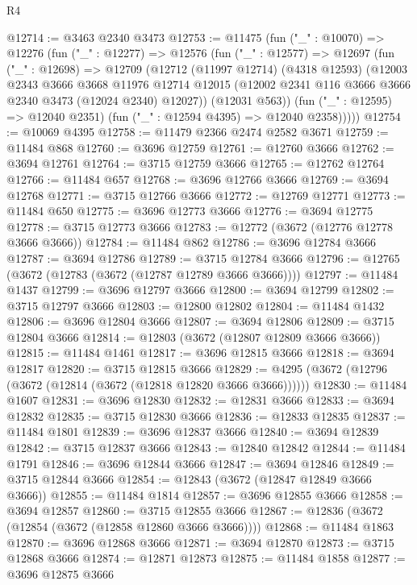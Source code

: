 \begin{lexlean}{R4}
\begin{coremodule}
@12714 := @3463 @2340 @3473
@12753 := @11475
    (fun ("_" : @10070) =>
    @12276
      (fun ("_" : @12277) =>
      @12576
        (fun ("_" : @12577) =>
        @12697
          (fun ("_" : @12698) =>
          @12709
            (@12712
              (@11997 @12714)
              (@4318 @12593)
              (@12003
                @2343
                @3666
                @3668
                @11976
                @12714
                @12015
                (@12002 @2341 @116 @3666 @3666 @2340 @3473 (@12024 @2340) @12027))
              (@12031 @563))
            (fun ("_" : @12595) => @12040 @2351)
            (fun ("_" : @12594 @4395) => @12040 @2358)))))
@12754 := @10069 @4395
@12758 := @11479 @2366 @2474 @2582 @3671
@12759 := @11484 @868
@12760 := @3696 @12759
@12761 := @12760 @3666
@12762 := @3694 @12761
@12764 := @3715 @12759 @3666
@12765 := @12762 @12764
@12766 := @11484 @657
@12768 := @3696 @12766 @3666
@12769 := @3694 @12768
@12771 := @3715 @12766 @3666
@12772 := @12769 @12771
@12773 := @11484 @650
@12775 := @3696 @12773 @3666
@12776 := @3694 @12775
@12778 := @3715 @12773 @3666
@12783 := @12772 (@3672 (@12776 @12778 @3666 @3666))
@12784 := @11484 @862
@12786 := @3696 @12784 @3666
@12787 := @3694 @12786
@12789 := @3715 @12784 @3666
@12796 := @12765 (@3672 (@12783 (@3672 (@12787 @12789 @3666 @3666))))
@12797 := @11484 @1437
@12799 := @3696 @12797 @3666
@12800 := @3694 @12799
@12802 := @3715 @12797 @3666
@12803 := @12800 @12802
@12804 := @11484 @1432
@12806 := @3696 @12804 @3666
@12807 := @3694 @12806
@12809 := @3715 @12804 @3666
@12814 := @12803 (@3672 (@12807 @12809 @3666 @3666))
@12815 := @11484 @1461
@12817 := @3696 @12815 @3666
@12818 := @3694 @12817
@12820 := @3715 @12815 @3666
@12829 := @4295 (@3672 (@12796 (@3672 (@12814 (@3672 (@12818 @12820 @3666 @3666))))))
@12830 := @11484 @1607
@12831 := @3696 @12830
@12832 := @12831 @3666
@12833 := @3694 @12832
@12835 := @3715 @12830 @3666
@12836 := @12833 @12835
@12837 := @11484 @1801
@12839 := @3696 @12837 @3666
@12840 := @3694 @12839
@12842 := @3715 @12837 @3666
@12843 := @12840 @12842
@12844 := @11484 @1791
@12846 := @3696 @12844 @3666
@12847 := @3694 @12846
@12849 := @3715 @12844 @3666
@12854 := @12843 (@3672 (@12847 @12849 @3666 @3666))
@12855 := @11484 @1814
@12857 := @3696 @12855 @3666
@12858 := @3694 @12857
@12860 := @3715 @12855 @3666
@12867 := @12836 (@3672 (@12854 (@3672 (@12858 @12860 @3666 @3666))))
@12868 := @11484 @1863
@12870 := @3696 @12868 @3666
@12871 := @3694 @12870
@12873 := @3715 @12868 @3666
@12874 := @12871 @12873
@12875 := @11484 @1858
@12877 := @3696 @12875 @3666

\end{coremodule}
\end{lexlean}
